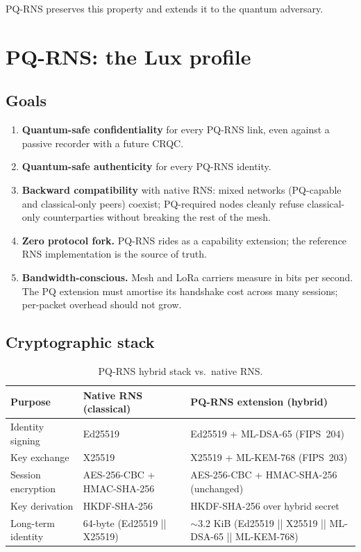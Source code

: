 \documentclass[11pt,a4paper]{article}
\begin{document}
PQ-RNS preserves this property and extends it to the quantum
adversary.

\section{PQ-RNS: the Lux profile}
\label{sec:pq-rns}

\subsection{Goals}

\begin{enumerate}[leftmargin=*,itemsep=0pt]
\item \textbf{Quantum-safe confidentiality} for every PQ-RNS link, even
  against a passive recorder with a future CRQC.
\item \textbf{Quantum-safe authenticity} for every PQ-RNS identity.
\item \textbf{Backward compatibility} with native RNS: mixed networks
  (PQ-capable and classical-only peers) coexist; PQ-required nodes
  cleanly refuse classical-only counterparties without breaking the
  rest of the mesh.
\item \textbf{Zero protocol fork.} PQ-RNS rides as a capability
  extension; the reference RNS implementation is the source of truth.
\item \textbf{Bandwidth-conscious.} Mesh and LoRa carriers measure in
  bits per second. The PQ extension must amortise its handshake cost
  across many sessions; per-packet overhead should not grow.
\end{enumerate}

\subsection{Cryptographic stack}

\begin{table}[H]
\centering
\small
\begin{tabularx}{\linewidth}{l X X}
\toprule
\textbf{Purpose} & \textbf{Native RNS (classical)} & \textbf{PQ-RNS extension (hybrid)} \\
\midrule
Identity signing & Ed25519 & Ed25519 + ML-DSA-65 (FIPS~204) \\
Key exchange & X25519 & X25519 + ML-KEM-768 (FIPS~203) \\
Session encryption & AES-256-CBC + HMAC-SHA-256 & AES-256-CBC + HMAC-SHA-256 (unchanged) \\
Key derivation & HKDF-SHA-256 & HKDF-SHA-256 over hybrid secret \\
Long-term identity & 64-byte (Ed25519 || X25519) & $\sim$3.2 KiB (Ed25519 || X25519 || ML-DSA-65 || ML-KEM-768) \\
\bottomrule
\end{tabularx}
\caption{PQ-RNS hybrid stack vs.\ native RNS.}
\end{table}
\end{document}
